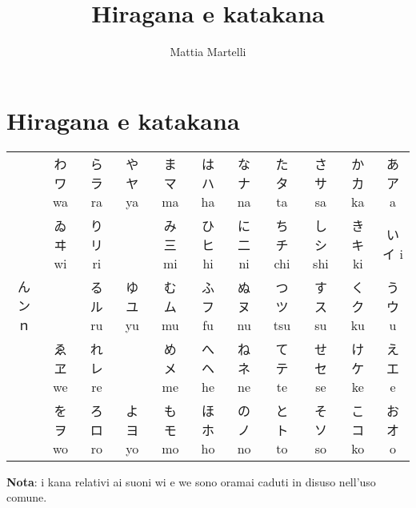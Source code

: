 \documentclass{article}
\title{Hiragana e katakana}
\author{Mattia Martelli}
\begin{document}
    \maketitle

    \tableofcontents

    \section{Hiragana e katakana}

        \centering
        \begin{japanese}
            \begin{tabular}{ | c | c | c | c | c | c | c | c | c | c | c | }
                \hline
                \multirow{5}{*}{ん ン ｎ}
                    & わ ワ wa & ら ラ ra & や ヤ ya & ま マ ma & は ハ ha & な ナ na & た タ ta & さ サ sa & か カ ka & あ ア a\\
                    \cline{2-11}
                    & ゐ ヰ wi & り リ ri & & み 三 mi & ひ ヒ hi & に 二 ni & ち チ chi & し シ shi & き キ ki & い イ i\\
                    \cline{2-11}
                    & & る ル ru & ゆ ユ yu & む ム mu & ふ フ fu & ぬ ヌ nu & つ ツ tsu & す ス su & く ク ku & う ウ u\\
                    \cline{2-11}
                    & ゑ ヱ we & れ レ re & & め メ me & へ ヘ he & ね ネ ne & て テ te & せ セ se & け ケ ke & え エ e\\
                    \cline{2-11}
                    & を ヲ wo & ろ ロ ro & よ ヨ yo & も モ mo & ほ ホ ho & の ノ no & と ト to & そ ソ so & こ コ ko & お オ o\\
                \hline
            \end{tabular}
        \end{japanese}

        \bigskip

        \textbf{Nota}: i kana relativi ai suoni \textjapanese{wi} e \textjapanese{we} sono oramai caduti in disuso nell'uso comune.
\end{document}
